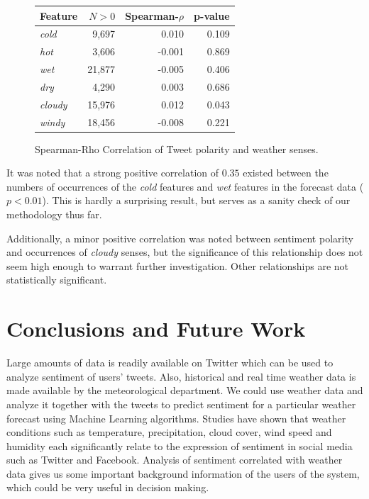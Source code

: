 \documentclass[a4paper,10pt]{article}
\begin{document}
    \begin{figure}
        \begin{tabular}{l | r r r }
        \textbf{Feature} & \textbf{$N > 0$} & \textbf{Spearman-$\rho$} & \textbf{p-value} \\
        \hline
        \textit{cold} & 9,697 & 0.010 & 0.109 \\
        \textit{hot} & 3,606 & -0.001 & 0.869 \\
        \textit{wet} & 21,877 & -0.005 & 0.406 \\
        \textit{dry} & 4,290 & 0.003 & 0.686 \\
        \textit{cloudy} & 15,976 & 0.012 & 0.043 \\
        \textit{windy} & 18,456 & -0.008 & 0.221 \\
        \end{tabular}
        \caption{Spearman-Rho Correlation of Tweet polarity and weather senses.}
        \label{fig:stats2}
    \end{figure}
    
    It was noted that a strong positive correlation of $0.35$ existed between the numbers of occurrences of the \textit{cold} features and \textit{wet} features in the forecast data ($p<0.01$). This is hardly a surprising result, but serves as a sanity check of our methodology thus far.

    Additionally, a minor positive correlation was noted between sentiment polarity and occurrences of \textit{cloudy} senses, but the significance of this relationship does not seem high enough to warrant further investigation. Other relationships are not statistically significant.

    \section{Conclusions and Future Work}
    \label{conclusion}
     Large amounts of data is readily available on Twitter which can be used to analyze sentiment of users' tweets. Also, historical and real time weather data is made available by the meteorological department. We could use weather data and analyze it together with the tweets to predict sentiment for a particular weather forecast using Machine Learning algorithms. Studies have shown that weather conditions such as temperature, precipitation, cloud cover, wind speed and humidity each significantly relate to the expression of sentiment in social media such as Twitter and Facebook. Analysis of sentiment correlated with weather data gives us some important background information of the users of the system, which could be very useful in decision making.
\end{document}
